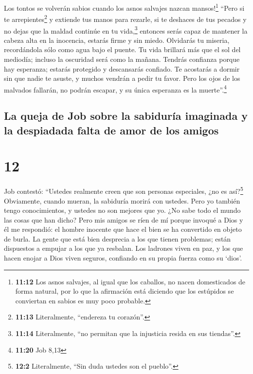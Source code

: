  Los tontos se volverán sabios cuando los asnos salvajes
nazcan mansos!\footnote{\textbf{11:12} Los asnos salvajes, al igual que
  los caballos, no nacen domesticados de forma natural, por lo que la
  afirmación está diciendo que los estúpidos se conviertan en sabios es
  muy poco probable.}  ``Pero si te
arrepientes\footnote{\textbf{11:13} Literalmente, ``endereza tu
  corazón''.} y extiende tus manos para rezarle,  si te
deshaces de tus pecados y no dejas que la maldad continúe en tu
vida,\footnote{\textbf{11:14} Literalmente, ``no permitan que la
  injusticia resida en sus tiendas''.}  entonces serás
capaz de mantener la cabeza alta en la inocencia, estarás firme y sin
miedo.  Olvidarás tu miseria, recordándola sólo como agua
bajo el puente.  Tu vida brillará más que el sol del
mediodía; incluso la oscuridad será como la mañana. 
Tendrás confianza porque hay esperanza; estarás protegido y descansarás
confiado.  Te acostarás a dormir sin que nadie te asuste,
y muchos vendrán a pedir tu favor.  Pero los ojos de los
malvados fallarán, no podrán escapar, y su única esperanza es la
muerte''.\footnote{\textbf{11:20} Job 8,13}

\hypertarget{la-queja-de-job-sobre-la-sabiduruxeda-imaginada-y-la-despiadada-falta-de-amor-de-los-amigos}{%
\subsection{La queja de Job sobre la sabiduría imaginada y la despiadada
falta de amor de los
amigos}\label{la-queja-de-job-sobre-la-sabiduruxeda-imaginada-y-la-despiadada-falta-de-amor-de-los-amigos}}

\hypertarget{section-11}{%
\section{12}\label{section-11}}

 Job contestó:  ``Ustedes realmente creen
que son personas especiales, ¿no es así?\footnote{\textbf{12:2}
  Literalmente, ``Sin duda ustedes son el pueblo''.} Obviamente, cuando
mueran, la sabiduría morirá con ustedes.  Pero yo también
tengo conocimientos, y ustedes no son mejores que yo. ¿No sabe todo el
mundo las cosas que han dicho?  Pero mis amigos se ríen de
mí porque invoqué a Dios y él me respondió: el hombre inocente que hace
el bien se ha convertido en objeto de burla.  La gente que
está bien desprecia a los que tienen problemas; están dispuestos a
empujar a los que ya resbalan.  Los ladrones viven en paz,
y los que hacen enojar a Dios viven seguros, confiando en su propia
fuerza como su `dios'.

